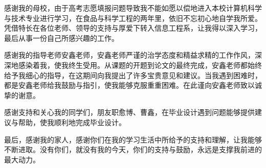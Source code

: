 \documentclass[a4paper]{ltxdoc}
\begin{document}
\begin{acknowledge}
	感谢我的母校，由于高考志愿填报问题导致我不能如愿以偿地进入本校计算机科学与技术专业进行学习，在食品与科学工程的两年里，依旧不忘初心地自学我所爱。凭借特长在各位老师、领导的支持与厚爱下转入信息工程系，让我得以深入学习，最后从事一份自己所感兴趣的工作。

	感谢我的指导老师安鑫老师，安鑫老师严谨的治学态度和精益求精的工作作风，深深地感染着我，使我终生受用。从课题的开题到论文的最终完成，安鑫老师都始终给予我细心的指导，在这期间向我提出了许多宝贵意见和建议。当我遇到困难时，都是安鑫老师给我鼓励与指引，使我能够克服重重困难。在此谨向安鑫老师致以诚挚的谢意。

	感谢支持和关心我的同学们，朋友职愈博、曹鑫，在毕业设计遇到问题能够提供建议与帮助，使我顺利地完成毕业设计。

	最后，感谢我的家人，感谢你们在我的学习生活中所给予的支持和理解，让我能够不断进取。没有你们，就没有我的今天，你们的支持与鼓励，永远是支撑我前进的最大动力。
\end{acknowledge}

\begin{appendix}
\end{appendix}
\end{document}
